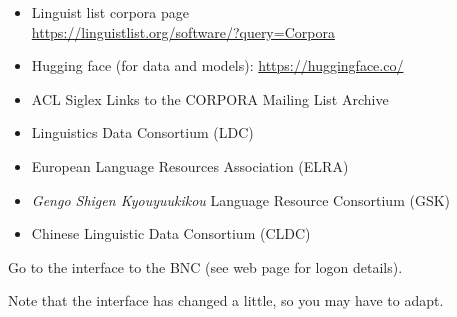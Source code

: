 \documentclass[a4paper,landscape,headrule,footrule,xetex]{foils}
\begin{document}

\begin{itemize}
\item Linguist list corpora page
  \\ \url{https://linguistlist.org/software/?query=Corpora}  
\item Hugging face (for data and models): \url{https://huggingface.co/}
  
\item ACL Siglex Links to the CORPORA Mailing List Archive
\item Linguistics Data Consortium (LDC)
\item European Language Resources Association (ELRA)
\item {} \textit{Gengo Shigen Kyouyuukikou} Language Resource Consortium (GSK)
\item {} Chinese Linguistic Data Consortium (CLDC)
\end{itemize}




Go to the \engcor interface to the BNC (see web page for logon details).

Note that the interface has changed a little, so you may have to adapt.
\end{document}
